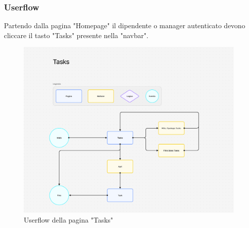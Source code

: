 \documentclass{report}
\begin{document}
\subsubsection*{Userflow}
Partendo dalla pagina "Homepage" il dipendente o manager autenticato devono cliccare il tasto "Tasks" presente nella "navbar".
\begin{figure}[H]
	\centering\includegraphics[width=1\textwidth]{images/microservizio-task/frontend/tasks-userflow.png}
	Userflow della pagina "Tasks"
\end{figure}
\end{document}
